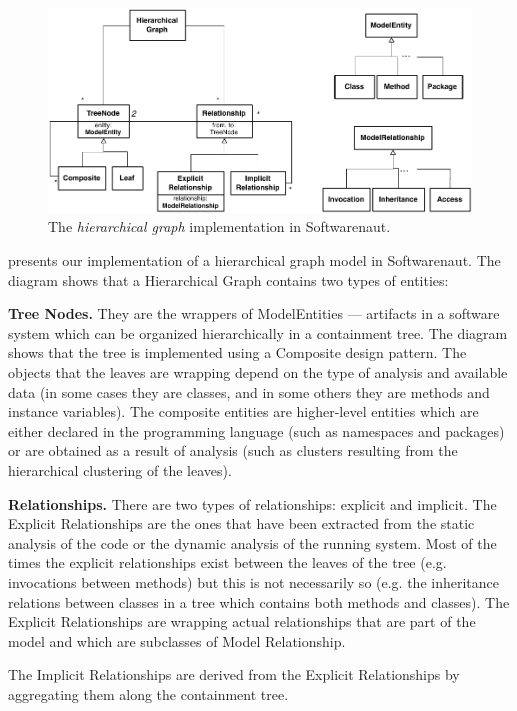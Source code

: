 \documentclass[preprint,12pt]{elsarticle}
\begin{document}
\begin{figure}[h]
\begin{center}
\includegraphics[width=0.8\linewidth]{HigraphModel}
\caption{The {\em hierarchical graph} implementation in Softwarenaut.}
\end{center}
\end{figure}

 presents our implementation of a hierarchical graph model in Softwarenaut.
The diagram shows that a Hierarchical Graph contains two types of entities: 

\begin{description}
\item {\bf Tree Nodes.} They are the wrappers of ModelEntities --- artifacts in a software system which can be organized hierarchically in a containment tree. The diagram shows that the tree is implemented using a Composite design pattern. The objects that the leaves are wrapping depend on the type of analysis and available data (in some cases they are classes, and in some others they are methods and instance variables). The composite entities are higher-level entities which are either declared in the programming language (such as namespaces and packages) or are obtained as a result of analysis (such as clusters resulting from the hierarchical clustering of the leaves).
\item {\bf Relationships.} There are two types of relationships: explicit and implicit. The Explicit Relationships are the ones that have been extracted from the static analysis of the code or the dynamic analysis of the running system. Most of the times the explicit relationships exist between the leaves of the tree (e.g. invocations between methods) but this is not necessarily so (e.g. the inheritance relations between classes in a tree which contains both methods and classes). The Explicit Relationships are wrapping actual relationships that are part of the model and which are subclasses of Model Relationship.

The Implicit Relationships are derived from the Explicit Relationships by aggregating them along the containment tree. %

\end{description}
\end{document}
